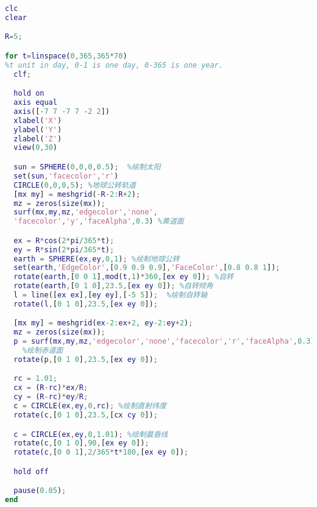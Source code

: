 
\begin{lstlisting}[language=matlab]
clc
clear

R=5;

for t=linspace(0,365,365*70) 
%t unit in day, 0-1 is one day, 0-365 is one year.
  clf;

  hold on
  axis equal
  axis([-7 7 -7 7 -2 2])
  xlabel('X')
  ylabel('Y')
  zlabel('Z')
  view(0,30)

  sun = SPHERE(0,0,0,0.5);  %绘制太阳
  set(sun,'facecolor','r')
  CIRCLE(0,0,0,5); %地球公转轨道
  [mx my] = meshgrid(-R-2:R+2);
  mz = zeros(size(mx));
  surf(mx,my,mz,'edgecolor','none',
  'facecolor','y','faceAlpha',0.3) %黄道面

  ex = R*cos(2*pi/365*t);
  ey = R*sin(2*pi/365*t);
  earth = SPHERE(ex,ey,0,1); %绘制地球公转
  set(earth,'EdgeColor',[0.9 0.9 0.9],'FaceColor',[0.8 0.8 1]);
  rotate(earth,[0 0 1],mod(t,1)*360,[ex ey 0]); %自转
  rotate(earth,[0 1 0],23.5,[ex ey 0]); %自转倾角
  l = line([ex ex],[ey ey],[-5 5]);  %绘制自转轴
  rotate(l,[0 1 0],23.5,[ex ey 0]);

  [mx my] = meshgrid(ex-2:ex+2, ey-2:ey+2);
  mz = zeros(size(mx));
  p = surf(mx,my,mz,'edgecolor','none','facecolor','r','faceAlpha',0.3);
    %绘制赤道面
  rotate(p,[0 1 0],23.5,[ex ey 0]);

  rc = 1.01;
  cx = (R-rc)*ex/R;
  cy = (R-rc)*ey/R;
  c = CIRCLE(ex,ey,0,rc); %绘制直射纬度
  rotate(c,[0 1 0],23.5,[cx cy 0]);

  c = CIRCLE(ex,ey,0,1.01); %绘制晨昏线
  rotate(c,[0 1 0],90,[ex ey 0]);
  rotate(c,[0 0 1],2/365*t*180,[ex ey 0]);

  hold off

  pause(0.05);
end

\end{lstlisting}